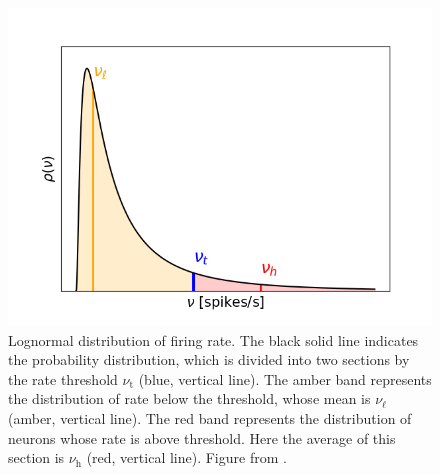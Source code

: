 \documentclass[a4paper, 12pt, twoside, openright]{book}
\newcommand{\rh}{\nu_\text{h}}
\newcommand{\rl}{\nu_{\ell}}
\newcommand{\rt}{\nu_\text{t}}
\begin{document}
\begin{figure}[t]
    \centering
    \includegraphics[scale=0.7]{figures/lognormal_dist.png}
    \caption{Lognormal distribution of firing rate. The black solid line indicates the probability distribution, which is divided into two sections by the rate threshold $\rt$ (blue, vertical line). The amber band represents the distribution of rate below the threshold, whose mean is $\rl$ (amber, vertical line). The red band represents the distribution of neurons whose rate is above threshold. Here the average of this section is $\rh$ (red, vertical line). Figure from \cite{Tiddia2023}.}
    \label{fig:lognormal}
\end{figure}
\end{document}
